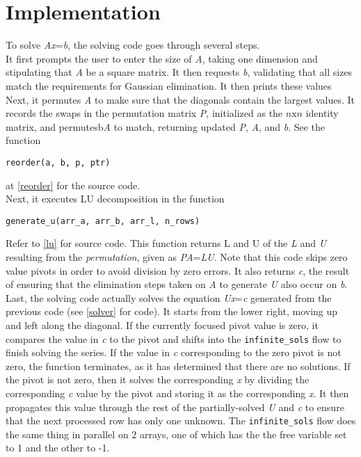 \documentclass{article}
\begin{document}
\section{Implementation}
To solve \emph{Ax}=\emph{b}, the solving code goes through several steps.\\
It first prompts the user to enter the size of \emph{A}, taking one dimension and stipulating that \emph{A} be a square matrix. It then requests \emph{b}, validating that all sizes match the requirements for Gaussian elimination. It then prints these values\\
Next, it permutes \emph{A} to make sure that the diagonals contain the largest values. It records the swaps in the permutation matrix \emph{P}, initialized as the \begin{math}n\text{x}n\end{math} identity matrix, and permutesb\emph{A} to match, returning updated \emph{P}, \emph{A}, and \emph{b}. See the function \begin{verbatim}reorder(a, b, p, ptr)\end{verbatim} at \ref{reorder} for the source code.\\
Next, it executes LU decomposition in the function \begin{verbatim}generate_u(arr_a, arr_b, arr_l, n_rows)\end{verbatim} Refer to \ref{lu} for source code. This function returns L and U of the \emph{L} and \emph{U} resulting from the \emph{permutation}, given as \emph{PA}=\emph{LU}. Note that this code skips zero value pivots in order to avoid division by zero errors. It also returns \emph{c}, the result of ensuring that the elimination steps taken on \emph{A} to generate \emph{U} also occur on \emph{b}.\\
Last, the solving code actually solves the equation \emph{Ux}=\emph{c} generated from the previous code (see \ref{solver} for code). It starts from the lower right, moving up and left along the diagonal. If the currently focused pivot value is zero, it compares the value in \emph{c} to the pivot and shifts into the \verb+infinite_sols+ flow to finish solving the series. If the value in \emph{c} corresponding to the zero pivot is not zero, the function terminates, as it has determined that there are no solutions. If the pivot is not zero, then it solves the corresponding \emph{x} by dividing the corresponding \emph{c} value by the pivot and storing it as the corresponding \emph{x}. It then propagates this value through the rest of the partially-solved \emph{U} and \emph{c} to ensure that the next processed row has only one unknown. The \verb+infinite_sols+ flow does the same thing in parallel on 2 arrays, one of which has the the free variable set to 1 and the other to -1.
\end{document}
